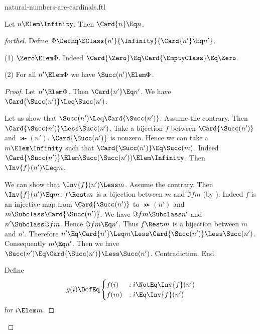 \documentclass{stex}
\begin{document}
\begin{smodule}{natural-numbers-are-cardinals.ftl}


\begin{theorem*}[forthel]
  Let $n \Elem \Infinity$.
  Then $\Card{n} \Eq n$.
\end{theorem*}
\begin{proof}[forthel]
  Define $\Phi \DefEq \SClass{n'}{\Infinity}{\Card{n'} \Eq n'}$.

  (1) $\Zero \Elem \Phi$.
  Indeed $\Card{\Zero} \Eq \Card{\EmptyClass} \Eq \Zero$.

  (2) For all $n' \Elem \Phi$ we have $\Succ(n') \Elem \Phi$.
  \begin{proof}
    Let $n' \Elem \Phi$.
    Then $\Card{n'} \Eq n'$.
    We have $\Card{\Succ(n')} \Leq \Succ(n')$.

    Let us show that $\Succ(n') \Leq \Card{\Succ(n')}$.
      Assume the contrary.
      Then $\Card{\Succ(n')} \Less \Succ(n')$.
      Take a bijection $f$ between $\Card{\Succ(n')}$ and $\Succ(n')$.
      $\Card{\Succ(n')}$ is nonzero.
      Hence we can take a $m \Elem \Infinity$ such that $\Card{\Succ(n')} \Eq \Succ(m)$.
      Indeed $\Card{\Succ(n')} \Elem \Succ(\Succ(n')) \Elem \Infinity$.
      Then $\Inv{f}(n') \Leq m$.

      We can show that $\Inv{f}(n') \Less m$.
        Assume the contrary.
        Then $\Inv{f}(n') \Eq m$.
        $f \Rest m$ is a bijection between $m$ and $\Im{f}{m}$ (by ).
        Indeed $f$ is an injective map from $\Card{\Succ(n')}$ to $\Succ(n')$ and
        $m \Subclass \Card{\Succ(n')}$.
        We have $\Im{f}{m} \Subclass n'$ and $n' \Subclass \Im{f}{m}$.
        Hence $\Im{f}{m} \Eq n'$.
        Thus $f \Rest m$ is a bijection between $m$ and $n'$.
        Therefore $n'
          \Eq \Card{n'}
          \Leq m
          \Less \Card{\Succ(n')}
          \Less \Succ(n')$.
        Consequently $m \Eq n'$.
        Then we have $\Succ(n') \Eq \Card{\Succ(n')} \Less \Succ(n')$.
        Contradiction.
      End.

      Define \[ g(i) \DefEq
        \begin{cases}
          f(i)  & : i \NotEq \Inv{f}(n')
          \\
          f(m)  & : i \Eq \Inv{f}(n')
        \end{cases} \]
      for $i \Elem m$.


\end{proof}
\end{proof}
\end{smodule}
\end{document}
